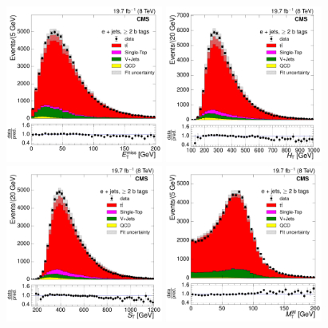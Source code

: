 \begin{figure}[hbtp]
    \centering
     \includegraphics[width=0.46\textwidth]{Chapters/07_08_09_Analysis/Images/control_plots/after_fit/8TeV/EPlusJets_patType1CorrectedPFMet_2orMoreBtags_with_ratio}\hfill
     \includegraphics[width=0.46\textwidth]{Chapters/07_08_09_Analysis/Images/control_plots/after_fit/8TeV/EPlusJets_HT_2orMoreBtags_with_ratio}\\                            
     \includegraphics[width=0.46\textwidth]{Chapters/07_08_09_Analysis/Images/control_plots/after_fit/8TeV/EPlusJets_patType1CorrectedPFMet_ST_2orMoreBtags_with_ratio}\hfill
     \includegraphics[width=0.46\textwidth]{Chapters/07_08_09_Analysis/Images/control_plots/after_fit/8TeV/EPlusJets_patType1CorrectedPFMet_MT_2orMoreBtags_with_ratio}\\     

\end{figure}
